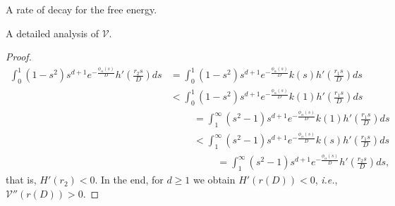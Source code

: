 \documentclass[reqno]{amsart} %
\begin{document}
\begin{section}{A rate of decay for the free energy.}
\begin{subsection}{A detailed analysis of  \texorpdfstring{$\mathcal{V}$}{V}.}
\begin{proof}
\begin{align*}
\int_{0}^1 (1-s^2)s^{d+1} e^{-\frac{\phi_{\alpha}(s)}{D}} h'\left(\frac{r_2 s}{D}\right)ds 
&= \int_{0}^1 (1-s^2)s^{d+1} e^{-\frac{\phi_{\alpha}(s)}{D}} k(s)h'\left(\frac{r_1 s}{D}\right)ds \\
&< \int_{0}^1 (1-s^2)s^{d+1} e^{-\frac{\phi_{\alpha}(s)}{D}} k(1)h'\left(\frac{r_1 s}{D}\right)ds \\
&\hspace{1cm}= \int_{1}^{\infty} (s^2-1)s^{d+1} e^{-\frac{\phi_{\alpha}(s)}{D}} k(1)h'\left(\frac{r_1 s}{D}\right)ds \\
&\hspace{1cm}< \int_{1}^{\infty} (s^2-1)s^{d+1} e^{-\frac{\phi_{\alpha}(s)}{D}} k(s)h'\left(\frac{r_1 s}{D}\right)ds \\
&\hspace{2cm}= \int_{1}^{\infty} (s^2-1)s^{d+1} e^{-\frac{\phi_{\alpha}(s)}{D}} h'\left(\frac{r_2 s}{D}\right)ds,
\end{align*}
that is, $H'(r_2)<0.$
In the end, for $d\geq 1$ we obtain $H'(r(D))<0 $, \emph{i.e.}, ~$\mathcal{V}''(r(D))>0$.
\end{proof}


\end{subsection}
\end{section}
\end{document}
